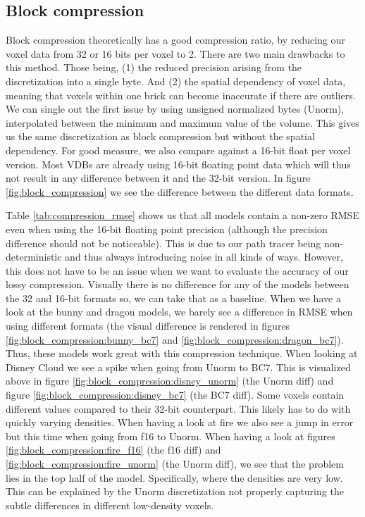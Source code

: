 \subsection{Block compression} \label{results:block_compression}
Block compression theoretically has a good compression ratio, by reducing our voxel data from 32 or 16 bits per voxel to 2. There are two main drawbacks to this method. Those being, (1) the reduced precision arising from the discretization into a single byte. And (2) the spatial dependency of voxel data, meaning that voxels within one brick can become inaccurate if there are outliers. We can single out the first issue by using unsigned normalized bytes (Unorm), interpolated between the minimum and maximum value of the volume. This gives us the same discretization as block compression but without the spatial dependency. For good measure, we also compare against a 16-bit float per voxel version. Most VDBs are already using 16-bit floating point data which will thus not result in any difference between it and the 32-bit version. In figure \ref{fig:block_compression} we see the difference between the different data formats.

Table \ref{tab:compression_rmse} shows us that all models contain a non-zero RMSE even when using the 16-bit floating point precision (although the precision difference should not be noticeable). This is due to our path tracer being non-deterministic and thus always introducing noise in all kinds of ways. However, this does not have to be an issue when we want to evaluate the accuracy of our lossy compression. Visually there is no difference for any of the models between the 32 and 16-bit formats so, we can take that as a baseline. When we have a look at the bunny and dragon models, we barely see a difference in RMSE when using different formats (the visual difference is rendered in figures \ref{fig:block_compression:bunny_bc7} and \ref{fig:block_compression:dragon_bc7}). Thus, these models work great with this compression technique. When looking at Disney Cloud we see a spike when going from Unorm to BC7. This is visualized above in figure \ref{fig:block_compression:disney_unorm} (the Unorm diff) and figure \ref{fig:block_compression:disney_bc7} (the BC7 diff). Some voxels contain different values compared to their 32-bit counterpart. This likely has to do with quickly varying densities. When having a look at fire we also see a jump in error but this time when going from f16 to Unorm. When having a look at figures \ref{fig:block_compression:fire_f16} (the f16 diff) and \ref{fig:block_compression:fire_unorm} (the Unorm diff), we see that the problem lies in the top half of the model. Specifically, where the densities are very low. This can be explained by the Unorm discretization not properly capturing the subtle differences in different low-density voxels.

